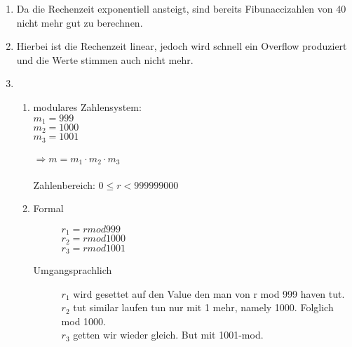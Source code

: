 \documentclass[a4paper,11pt]{article}             %
\begin{document}

\begin{enumerate}

\item Da die Rechenzeit exponentiell ansteigt, sind bereits Fibunaccizahlen von 40 nicht mehr gut zu berechnen.
\item Hierbei ist die Rechenzeit linear, jedoch wird schnell ein Overflow produziert und die Werte stimmen auch nicht mehr.
\item 
\begin{enumerate}
\item 
modulares Zahlensystem:\\
$m_1 = 999$\\
$m_2 = 1000$\\
$m_3 = 1001$\\
\\
$\Rightarrow m = m_1 \cdot m_2 \cdot m_3$\\
\\
Zahlenbereich: $0 \leq r < 999999000$

\item
\begin{description}
\item [Formal]
$r_1 = r mod 999$\\
$r_2 = r mod 1000$\\
$r_3 = r mod 1001$\\

\item [Umgangsprachlich]
$r_1$ wird gesettet auf den Value den man von r mod 999 haven tut.\\
$r_2$ tut similar laufen tun nur mit 1 mehr, namely 1000. Folglich mod 1000.\\
$r_3$ getten wir wieder gleich. But mit 1001-mod.
\end{description}

\end{enumerate}

\end{enumerate}
\end{document}
